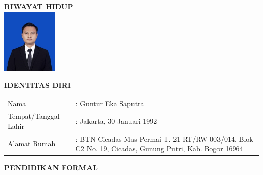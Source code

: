 \newpage %


\pagestyle{empty}


%			

\centering \large \textbf{RIWAYAT HIDUP}\\
\hspace{1,2cm}
\includegraphics[width=0.2\textwidth, left]{foto_cv_guntur.jpg}

\vspace{1cm}
\noindent \textbf{IDENTITAS DIRI}
\vspace{0.2cm}


\begin{table}[H]
	\label{tab:my-table}
	\begin{tabular}{p{5cm}p{7cm}}
		Nama                 & : Guntur Eka Saputra                                                                                  \\
		Tempat/Tanggal Lahir & : Jakarta, 30 Januari 1992                                                                            \\
		Alamat Rumah         & : BTN Cicadas Mas Permai T. 21 RT/RW 003/014, Blok C2 No. 19, Cicadas, Gunung Putri, Kab. Bogor 16964
	\end{tabular}
\end{table}


\noindent \textbf{PENDIDIKAN FORMAL}
\vspace{0.2cm}

